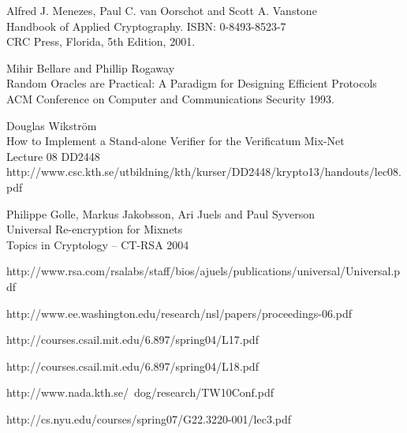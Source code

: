 \clearpage
\begin{thebibliography}{9}

  Alfred J. Menezes, Paul C. van Oorschot and Scott A. Vanstone\\
  Handbook of Applied Cryptography.
  ISBN: 0-8493-8523-7\\
  CRC Press, Florida,
  5th Edition,
  2001.

   Mihir Bellare and Phillip Rogaway\\
   Random Oracles are Practical: A Paradigm for Designing Efficient Protocols\\
   ACM Conference on Computer and Communications Security 1993.

   Douglas Wikström\\
   How to Implement a Stand-alone Verifier for the Verificatum Mix-Net\\

  Lecture 08 DD2448
  http://www.csc.kth.se/utbildning/kth/kurser/DD2448/krypto13/handouts/lec08.pdf

   Philippe Golle, Markus Jakobsson, Ari Juels and Paul Syverson\\
   Universal Re-encryption for Mixnets\\
   Topics in Cryptology – CT-RSA 2004

   http://www.rsa.com/rsalabs/staff/bios/ajuels/publications/universal/Universal.pdf


   http://www.ee.washington.edu/research/nsl/papers/proceedings-06.pdf

   http://courses.csail.mit.edu/6.897/spring04/L17.pdf

   http://courses.csail.mit.edu/6.897/spring04/L18.pdf

   http://www.nada.kth.se/~dog/research/TW10Conf.pdf

   http://cs.nyu.edu/courses/spring07/G22.3220-001/lec3.pdf


\end{thebibliography}
